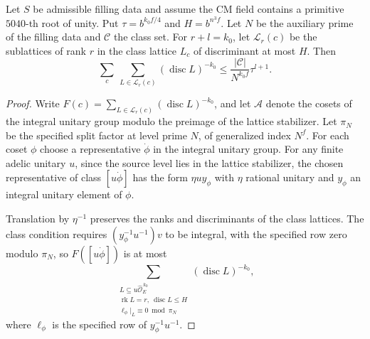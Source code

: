 \begin{lemma}
\label{lem:b-corank-lattices}
\emitthmsource
Let $S$ be admissible filling data and assume the CM field contains a primitive $5040$-th root of unity.
Put $\tau=b^{k_0 f/4}$ and $H=b^{n^3f}$. Let $N$ be the auxiliary prime of the filling data and $\mathcal C$ the class set.
For $r+l=k_0$, let $\mathcal L_r(c)$ be the sublattices of rank $r$ in the class lattice $L_c$
of discriminant at most $H$. Then
\[
 \sum_c\ \sum_{L\in\mathcal L_r(c)}(\operatorname{disc}L)^{-k_0}
 \le \frac{|\mathcal C|}{N^{k_0f}}\tau^{l+1}.
\]
\end{lemma}
\begin{proof}
Write $F(c)=\sum_{L\in\mathcal L_r(c)}(\operatorname{disc}L)^{-k_0}$,
and let $\mathcal A$ denote the cosets of the integral unitary group modulo the preimage of the lattice stabilizer.
Let $\pi_N$ be the specified split factor at level prime $N$, of generalized index $N^f$.
For each coset $\phi$ choose a representative $\dot\phi$ in the integral unitary group.
For any finite adelic unitary $u$, since the source level lies in the lattice stabilizer,
the chosen representative of class $[u\dot\phi]$ has the form
$\eta u y_\phi$ with $\eta$ rational unitary and $y_\phi$ an integral unitary element of $\phi$.

Translation by $\eta^{-1}$ preserves the ranks and discriminants of the class lattices.
The class condition requires $(y_\phi^{-1}u^{-1})v$ to be integral, with the specified row zero modulo $\pi_N$,
so $F([u\dot\phi])$ is at most
\[
 \sum_{\substack{L\subseteq u\widehat{\mathcal O}_E^{\,k_0}\\
         \operatorname{rk}L=r,\ \operatorname{disc}L\le H\\
         \ell_\phi|_L\equiv 0\bmod \pi_N}}(\operatorname{disc}L)^{-k_0},
\]
where $\ell_\phi$ is the specified row of $y_\phi^{-1}u^{-1}$.


\end{proof}
